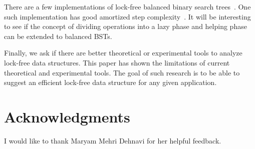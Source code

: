 \documentclass[letterpaper]{article}
\begin{document}
There are a few implementations of lock-free balanced binary search trees~\cite{BrownER14}. One such implementation has good amortized step complexity~\cite{Ko18}. It will be interesting to see if the concept of dividing operations into a lazy phase and helping phase can be extended to balanced BSTs.

Finally, we ask if there are better theoretical or experimental tools to analyze lock-free data structures. This paper has shown the limitations of current theoretical and experimental tools. The goal of such research is to be able to suggest an efficient lock-free data structure for any given application.

\section{Acknowledgments}
I would like to thank Maryam Mehri Dehnavi for her helpful feedback.


\end{document}
